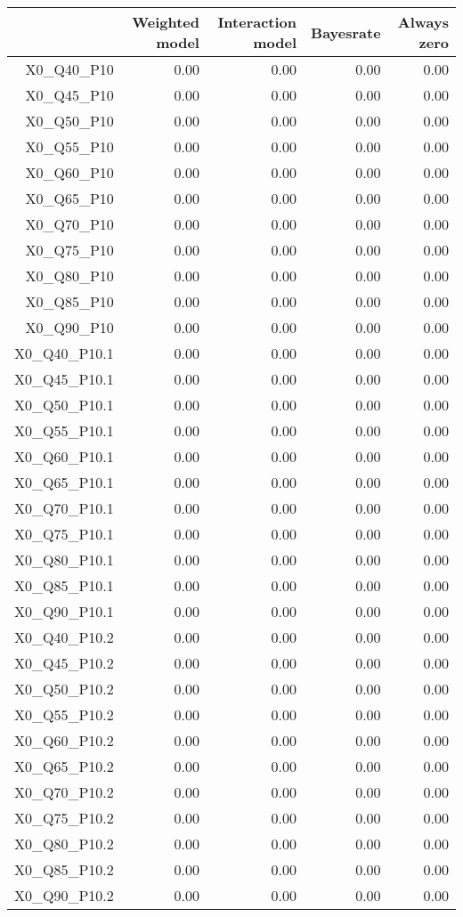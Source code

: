 \begin{table}[ht]
\centering
\begin{tabular}{rrrrr}
  \hline
 & Weighted model & Interaction model & Bayesrate & Always zero \\ 
  \hline
X0\_Q40\_P10 & 0.00 & 0.00 & 0.00 & 0.00 \\ 
  X0\_Q45\_P10 & 0.00 & 0.00 & 0.00 & 0.00 \\ 
  X0\_Q50\_P10 & 0.00 & 0.00 & 0.00 & 0.00 \\ 
  X0\_Q55\_P10 & 0.00 & 0.00 & 0.00 & 0.00 \\ 
  X0\_Q60\_P10 & 0.00 & 0.00 & 0.00 & 0.00 \\ 
  X0\_Q65\_P10 & 0.00 & 0.00 & 0.00 & 0.00 \\ 
  X0\_Q70\_P10 & 0.00 & 0.00 & 0.00 & 0.00 \\ 
  X0\_Q75\_P10 & 0.00 & 0.00 & 0.00 & 0.00 \\ 
  X0\_Q80\_P10 & 0.00 & 0.00 & 0.00 & 0.00 \\ 
  X0\_Q85\_P10 & 0.00 & 0.00 & 0.00 & 0.00 \\ 
  X0\_Q90\_P10 & 0.00 & 0.00 & 0.00 & 0.00 \\ 
  X0\_Q40\_P10.1 & 0.00 & 0.00 & 0.00 & 0.00 \\ 
  X0\_Q45\_P10.1 & 0.00 & 0.00 & 0.00 & 0.00 \\ 
  X0\_Q50\_P10.1 & 0.00 & 0.00 & 0.00 & 0.00 \\ 
  X0\_Q55\_P10.1 & 0.00 & 0.00 & 0.00 & 0.00 \\ 
  X0\_Q60\_P10.1 & 0.00 & 0.00 & 0.00 & 0.00 \\ 
  X0\_Q65\_P10.1 & 0.00 & 0.00 & 0.00 & 0.00 \\ 
  X0\_Q70\_P10.1 & 0.00 & 0.00 & 0.00 & 0.00 \\ 
  X0\_Q75\_P10.1 & 0.00 & 0.00 & 0.00 & 0.00 \\ 
  X0\_Q80\_P10.1 & 0.00 & 0.00 & 0.00 & 0.00 \\ 
  X0\_Q85\_P10.1 & 0.00 & 0.00 & 0.00 & 0.00 \\ 
  X0\_Q90\_P10.1 & 0.00 & 0.00 & 0.00 & 0.00 \\ 
  X0\_Q40\_P10.2 & 0.00 & 0.00 & 0.00 & 0.00 \\ 
  X0\_Q45\_P10.2 & 0.00 & 0.00 & 0.00 & 0.00 \\ 
  X0\_Q50\_P10.2 & 0.00 & 0.00 & 0.00 & 0.00 \\ 
  X0\_Q55\_P10.2 & 0.00 & 0.00 & 0.00 & 0.00 \\ 
  X0\_Q60\_P10.2 & 0.00 & 0.00 & 0.00 & 0.00 \\ 
  X0\_Q65\_P10.2 & 0.00 & 0.00 & 0.00 & 0.00 \\ 
  X0\_Q70\_P10.2 & 0.00 & 0.00 & 0.00 & 0.00 \\ 
  X0\_Q75\_P10.2 & 0.00 & 0.00 & 0.00 & 0.00 \\ 
  X0\_Q80\_P10.2 & 0.00 & 0.00 & 0.00 & 0.00 \\ 
  X0\_Q85\_P10.2 & 0.00 & 0.00 & 0.00 & 0.00 \\ 
  X0\_Q90\_P10.2 & 0.00 & 0.00 & 0.00 & 0.00 \\ 
   \hline
\end{tabular}
\end{table}
